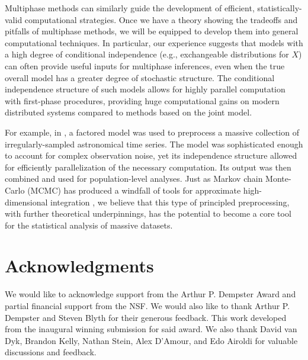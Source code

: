 Multiphase methods can similarly guide the development of efficient, statistically-valid computational strategies.
Once we have a theory showing the tradeoffs and pitfalls of multiphase methods, we will be equipped to develop them into general computational techniques.
In particular, our experience suggests that models with a high degree of conditional independence (e.g., exchangeable distributions for $X$) can often provide useful inputs for multiphase inferences, even when the true overall model has a greater degree of stochastic structure.
The conditional independence structure of such models allows for highly parallel computation with first-phase procedures, providing huge computational gains on modern distributed systems compared to methods based on the  joint model.

For example, in \citet{Blocker2012}, a factored model was used to preprocess a massive collection of irregularly-sampled astronomical time series.
The model was sophisticated enough to account for complex observation noise, yet its independence structure allowed for efficiently parallelization of the necessary computation.
Its output was then combined and used for population-level analyses.
Just as Markov chain Monte-Carlo (MCMC) has produced a windfall of tools for approximate high-dimensional integration \citep[see][for many examples]{Brooks2010}, we believe that this type of principled preprocessing, with further theoretical underpinnings, has the potential to become a core tool for the statistical analysis of massive datasets.

\section*{Acknowledgments}
We would like to acknowledge support from the Arthur P. Dempster Award and partial financial support from the NSF.
We would also like to thank Arthur P. Dempster and Steven Blyth for their generous feedback.
This work developed from the inaugural winning submission for said award.
We also thank David van Dyk, Brandon Kelly, Nathan Stein, Alex D'Amour, and Edo Airoldi for valuable discussions and feedback.
